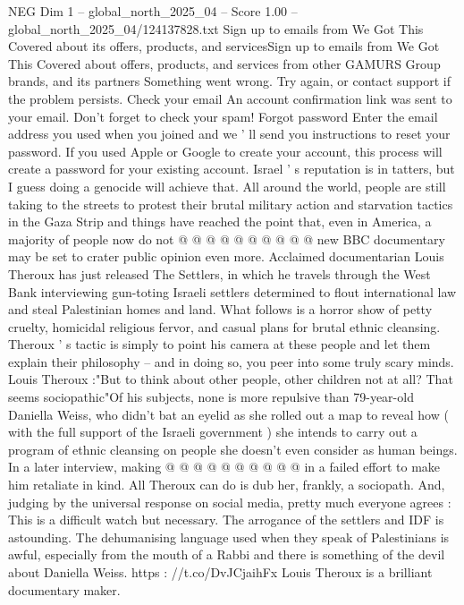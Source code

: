 \begin{textsample}{NEG Dim 1 – global\_north\_2025\_04 – Score 1.00 – global\_north\_2025\_04/124137828.txt}  \label{ex:f1_neg_106}
Sign up to emails from We Got This Covered about its offers, products, and servicesSign up to emails from We Got This Covered about offers, products, and services from other GAMURS Group brands, and its partners Something went wrong.
Try again, or contact support if the problem persists.
Check your email An account confirmation link was sent to your email.
Don't forget to check your spam!
Forgot password Enter the email address you used when you joined and we ' ll send you instructions to reset your password.
If you used Apple or Google to create your account, this process will create a password for your existing account.
Israel ' s reputation is in tatters, but I guess doing a genocide will achieve that.
All around the world, people are still taking to the streets to protest their brutal military action and starvation tactics in the Gaza Strip and things have reached the point that, even in America, a majority of people now do not @ @ @ @ @ @ @ @ @ @ new BBC documentary may be set to crater public opinion even more.
Acclaimed documentarian Louis Theroux has just released The Settlers, in which he travels through the West Bank interviewing gun-toting Israeli settlers determined to flout international law and steal Palestinian homes and land.
What follows is a horror show of petty cruelty, homicidal religious fervor, and casual plans for brutal ethnic cleansing.
Theroux ' s tactic is simply to point his camera at these people and let them explain their philosophy -- and in doing so, you peer into some truly scary minds.
Louis Theroux :"But to think about other people, other children not at all?
That seems sociopathic"Of his subjects, none is more repulsive than 79-year-old Daniella Weiss, who didn't bat an eyelid as she rolled out a map to reveal how ( with the full support of the Israeli government ) she intends to carry out a program of ethnic cleansing on people she doesn't even consider as human beings.
In a later interview, making @ @ @ @ @ @ @ @ @ @ in a failed effort to make him retaliate in kind.
All Theroux can do is dub her, frankly, a sociopath.
And, judging by the universal response on social media, pretty much everyone agrees : This is a difficult watch but necessary.
The arrogance of the settlers and IDF is astounding.
The dehumanising language used when they speak of Palestinians is awful, especially from the mouth of a Rabbi and there is something of the devil about Daniella Weiss. https : //t.co/DvJCjaihFx Louis Theroux is a brilliant documentary maker.

\end{textsample}
